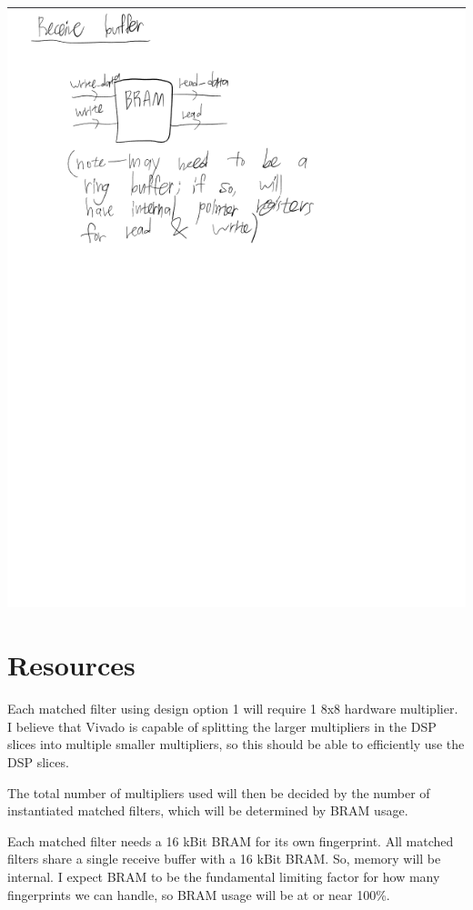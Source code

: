 \documentclass{article}
\begin{document}
\newpage
\includegraphics[width=6.5in]{Modules_3.png}

\section{Resources}

Each matched filter using design option 1 will require 1 8x8 hardware multiplier. I believe that Vivado is capable of splitting the larger multipliers in the DSP slices into multiple smaller multipliers, so this should be able to efficiently use the DSP slices.

The total number of multipliers used will then be decided by the number of instantiated matched filters, which will be determined by BRAM usage.

Each matched filter needs a 16 kBit BRAM for its own fingerprint. All matched filters share a single receive buffer with a 16 kBit BRAM. So, memory will be internal. I expect BRAM to be the fundamental limiting factor for how many fingerprints we can handle, so BRAM usage will be at or near 100\%.
\end{document}
